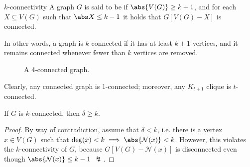 \documentclass[a4paper, 12pt]{report}
\begin{document}
    \begin{frameddefn}{$k$-connectivity}
        A graph $G$ is said to be  if $\abs{V(G)} \ge k + 1$, and for each $X \subseteq V(G)$ such that $\abs X \le k - 1$ it holds that $G[V(G) - X]$ is connected.
    \end{frameddefn}

    In other words, a graph is $k$-connected if it has at least $k + 1$ vertices, and it remains connected whenever fewer than $k$ vertices are removed.

    \begin{figure}[H]
        \centering
        \caption{A 4-connected graph.}
    \end{figure}

    Clearly, any connected graph is 1-connected; moreover, any $K_{t +1}$ clique is $t$-connected.

    \begin{framedprop}[label={kconn}]{}
        If $G$ is $k$-connected, then $\delta \ge k$.
    \end{framedprop}

    \begin{proof}
        By way of contradiction, assume that $\delta < k$, i.e. there is a vertex $x \in V(G)$ such that $\deg(x) < k \implies \abs{\mathcal N(x)} < k$. However, this violates the $k$-connectivity of $G$, because $G[V(G) - \mathcal N (x)]$ is disconnected even though $\abs{\mathcal N(x)} \le k - 1$ $\lightning$.
    \end{proof}
\end{document}
